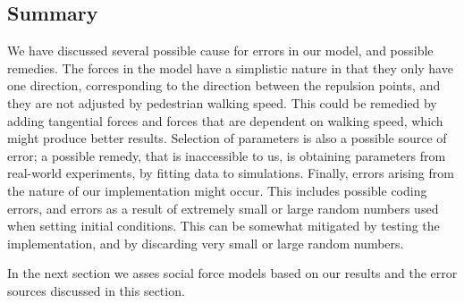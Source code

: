 \subsection{Summary}
We have discussed several possible cause for errors in our model, and possible 
remedies. The forces in the model have a simplistic nature in that they only 
have one direction, corresponding to the direction between the repulsion 
points, and they are not adjusted by pedestrian walking speed. This could be 
remedied by adding tangential forces and forces that are dependent on walking 
speed, which might produce better results. Selection of parameters is also a 
possible source of error; a possible remedy, that is inaccessible to us, is 
obtaining parameters from real-world experiments, by fitting data to 
simulations. Finally, errors arising from the nature of our implementation 
might occur. This includes possible coding errors, and errors as a result of 
extremely small or large random numbers used when setting initial conditions. 
This can be somewhat mitigated by testing the implementation, and by 
discarding very small or large random numbers.

In the next section we asses social force models based on our results and the 
error sources discussed in this section.
